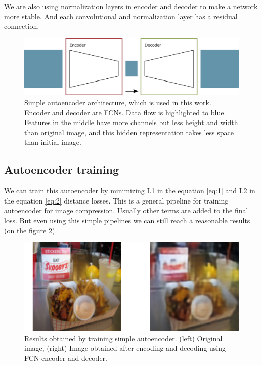 We are also using normalization layers in encoder and decoder to make a network more stable. And each convolutional and normalization layer has a residual connection.

\begin{figure}[!ht]
    \centering
    \includegraphics[width=\textwidth]{figure/general-autoencoder.png}
    \caption{Simple autoencoder architecture, which is used in this work. Encoder and decoder are FCNs. Data flow is highlighted to blue. Features in the middle have more channels but less height and width than original image, and this hidden representation takes less space than initial image.}
    \label{autoencoder}
\end{figure}

\subsection{Autoencoder training}

We can train this autoencoder by minimizing L1 in the equation \ref{eq:1} and L2 in the equation \ref{eq:2} distance losses. This is a general pipeline for training autoencoder for image compression. Usually other terms are added to the final loss. But even using this simple pipelines we can still reach a reasonable results (on the figure \ref{autoencoder-result}).

\begin{figure}[!ht]
    \centering
    \includegraphics[width=\textwidth]{figure/autoencoder-result.png}
    \caption{Results obtained by training simple autoencoder. (left) Original image, (right) Image obtained after encoding and decoding  using FCN encoder and decoder.}
    \label{autoencoder-result}
\end{figure}

